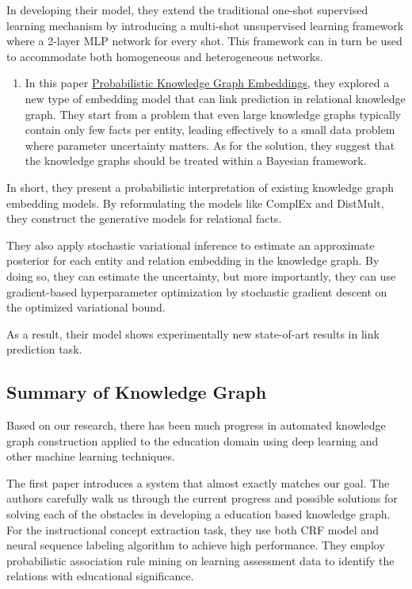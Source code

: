 \documentclass{acm_proc_article-sp}
\providecommand{\tightlist}{%
  \setlength{\itemsep}{0pt}\setlength{\parskip}{0pt}}
\begin{document}
In developing their model, they extend the traditional one-shot
supervised learning mechanism by introducing a multi-shot unsupervised
learning framework where a 2-layer MLP network for every shot. This
framework can in turn be used to accommodate both homogeneous and
heterogeneous networks.

\begin{enumerate}
\def\labelenumi{\arabic{enumi}.}
\setcounter{enumi}{2}
\tightlist
\item
  In this paper
  \href{https://openreview.net/pdf?id=rJ4qXnCqFX}{Probabilistic
  Knowledge Graph Embeddings}, they explored a new type of embedding
  model that can link prediction in relational knowledge graph. They
  start from a problem that even large knowledge graphs typically
  contain only few facts per entity, leading effectively to a small data
  problem where parameter uncertainty matters. As for the solution, they
  suggest that the knowledge graphs should be treated within a Bayesian
  framework.
\end{enumerate}

In short, they present a probabilistic interpretation of existing
knowledge graph embedding models. By reformulating the models like
ComplEx and DistMult, they construct the generative models for
relational facts.

They also apply stochastic variational inference to estimate an
approximate posterior for each entity and relation embedding in the
knowledge graph. By doing so, they can estimate the uncertainty, but
more importantly, they can use gradient-based hyperparameter
optimization by stochastic gradient descent on the optimized variational
bound.

As a result, their model shows experimentally new state-of-art results
in link prediction task.

\subsection{Summary of Knowledge
Graph}\label{summary-of-knowledge-graph}

Based on our research, there has been much progress in automated
knowledge graph construction applied to the education domain using deep
learning and other machine learning techniques.

The first paper introduces a system that almost exactly matches our
goal. The authors carefully walk us through the current progress and
possible solutions for solving each of the obstacles in developing a
education based knowledge graph. For the instructional concept
extraction task, they use both CRF model and neural sequence labeling
algorithm to achieve high performance. They employ probabilistic
association rule mining on learning assessment data to identify the
relations with educational significance.
\end{document}
